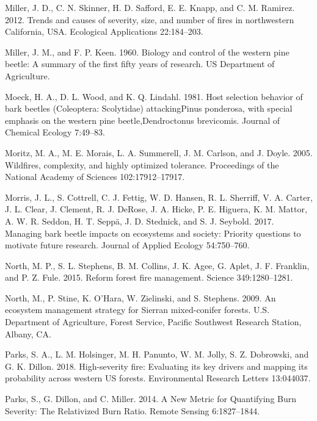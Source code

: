 \documentclass[twoside,12pt,final]{ucthesis-CA2012}
\begin{document}
\begin{ucmainmatter}
\hypertarget{ref-miller2012}{}
Miller, J. D., C. N. Skinner, H. D. Safford, E. E. Knapp, and C. M.
Ramirez. 2012. Trends and causes of severity, size, and number of fires
in northwestern California, USA. Ecological Applications 22:184--203.

\hypertarget{ref-miller1960}{}
Miller, J. M., and F. P. Keen. 1960. Biology and control of the western
pine beetle: A summary of the first fifty years of research. US
Department of Agriculture.

\hypertarget{ref-moeck1981}{}
Moeck, H. A., D. L. Wood, and K. Q. Lindahl. 1981. Host selection
behavior of bark beetles (Coleoptera: Scolytidae) attackingPinus
ponderosa, with special emphasis on the western pine beetle,Dendroctonus
brevicomis. Journal of Chemical Ecology 7:49--83.

\hypertarget{ref-moritz2005}{}
Moritz, M. A., M. E. Morais, L. A. Summerell, J. M. Carlson, and J.
Doyle. 2005. Wildfires, complexity, and highly optimized tolerance.
Proceedings of the National Academy of Sciences 102:17912--17917.

\hypertarget{ref-morris2017}{}
Morris, J. L., S. Cottrell, C. J. Fettig, W. D. Hansen, R. L. Sherriff,
V. A. Carter, J. L. Clear, J. Clement, R. J. DeRose, J. A. Hicke, P. E.
Higuera, K. M. Mattor, A. W. R. Seddon, H. T. Seppä, J. D. Stednick, and
S. J. Seybold. 2017. Managing bark beetle impacts on ecosystems and
society: Priority questions to motivate future research. Journal of
Applied Ecology 54:750--760.

\hypertarget{ref-north2015}{}
North, M. P., S. L. Stephens, B. M. Collins, J. K. Agee, G. Aplet, J. F.
Franklin, and P. Z. Fule. 2015. Reform forest fire management. Science
349:1280--1281.

\hypertarget{ref-north2009a}{}
North, M., P. Stine, K. O'Hara, W. Zielinski, and S. Stephens. 2009. An
ecosystem management strategy for Sierran mixed-conifer forests. U.S.
Department of Agriculture, Forest Service, Pacific Southwest Research
Station, Albany, CA.

\hypertarget{ref-parks2018}{}
Parks, S. A., L. M. Holsinger, M. H. Panunto, W. M. Jolly, S. Z.
Dobrowski, and G. K. Dillon. 2018. High-severity fire: Evaluating its
key drivers and mapping its probability across western US forests.
Environmental Research Letters 13:044037.

\hypertarget{ref-parks2014a}{}
Parks, S., G. Dillon, and C. Miller. 2014. A New Metric for Quantifying
Burn Severity: The Relativized Burn Ratio. Remote Sensing 6:1827--1844.


\end{ucmainmatter}
\end{document}
